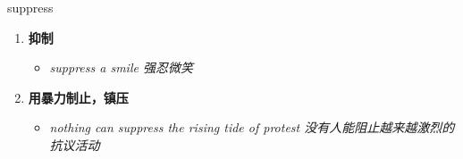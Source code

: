 
\begin{frame}
{\huge suppress}
\begin{center}
\begin{enumerate}\Large
  \item \textbf{抑制}
  \begin{itemize}
    \item \em{\Large{suppress a smile 强忍微笑}}
  \end{itemize}
  \item \textbf{用暴力制止，镇压}
  \begin{itemize}
    \item \em{\Large{nothing can suppress the rising tide of protest 没有人能阻止越来越激烈的抗议活动}}
  \end{itemize}
\end{enumerate}
\end{center}
\end{frame}
